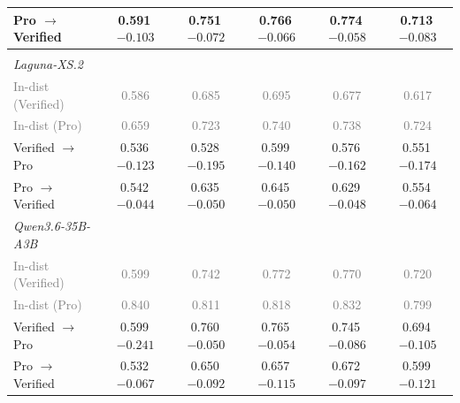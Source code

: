 \begin{table}[t]
\begin{tabular}{lccccc}
\qquad{}Pro $\rightarrow$ Verified & 0.591\,{\scriptsize \textcolor{red!70!black}{$-0.103$}} & 0.751\,{\scriptsize \textcolor{red!70!black}{$-0.072$}} & 0.766\,{\scriptsize \textcolor{red!70!black}{$-0.066$}} & 0.774\,{\scriptsize \textcolor{red!70!black}{$-0.058$}} & 0.713\,{\scriptsize \textcolor{red!70!black}{$-0.083$}}  \\
\midrule
\multicolumn{6}{l}{\textit{\Regressions{}}} \\
\quad{}\textit{Laguna-XS.2} \\
\qquad{}\textcolor{gray}{\small In-dist (Verified)} & \textcolor{gray}{\small 0.586} & \textcolor{gray}{\small 0.685} & \textcolor{gray}{\small 0.695} & \textcolor{gray}{\small 0.677} & \textcolor{gray}{\small 0.617} \\
\qquad{}\textcolor{gray}{\small In-dist (Pro)} & \textcolor{gray}{\small 0.659} & \textcolor{gray}{\small 0.723} & \textcolor{gray}{\small 0.740} & \textcolor{gray}{\small 0.738} & \textcolor{gray}{\small 0.724} \\
\qquad{}Verified $\rightarrow$ Pro & 0.536\,{\scriptsize \textcolor{red!70!black}{$-0.123$}} & 0.528\,{\scriptsize \textcolor{red!70!black}{$-0.195$}} & 0.599\,{\scriptsize \textcolor{red!70!black}{$-0.140$}} & 0.576\,{\scriptsize \textcolor{red!70!black}{$-0.162$}} & 0.551\,{\scriptsize \textcolor{red!70!black}{$-0.174$}}  \\
\qquad{}Pro $\rightarrow$ Verified & 0.542\,{\scriptsize \textcolor{red!70!black}{$-0.044$}} & 0.635\,{\scriptsize \textcolor{red!70!black}{$-0.050$}} & 0.645\,{\scriptsize \textcolor{red!70!black}{$-0.050$}} & 0.629\,{\scriptsize \textcolor{red!70!black}{$-0.048$}} & 0.554\,{\scriptsize \textcolor{red!70!black}{$-0.064$}}  \\
\quad{}\textit{Qwen3.6-35B-A3B} \\
\qquad{}\textcolor{gray}{\small In-dist (Verified)} & \textcolor{gray}{\small 0.599} & \textcolor{gray}{\small 0.742} & \textcolor{gray}{\small 0.772} & \textcolor{gray}{\small 0.770} & \textcolor{gray}{\small 0.720} \\
\qquad{}\textcolor{gray}{\small In-dist (Pro)} & \textcolor{gray}{\small 0.840} & \textcolor{gray}{\small 0.811} & \textcolor{gray}{\small 0.818} & \textcolor{gray}{\small 0.832} & \textcolor{gray}{\small 0.799} \\
\qquad{}Verified $\rightarrow$ Pro & 0.599\,{\scriptsize \textcolor{red!70!black}{$-0.241$}} & 0.760\,{\scriptsize \textcolor{red!70!black}{$-0.050$}} & 0.765\,{\scriptsize \textcolor{red!70!black}{$-0.054$}} & 0.745\,{\scriptsize \textcolor{red!70!black}{$-0.086$}} & 0.694\,{\scriptsize \textcolor{red!70!black}{$-0.105$}}  \\
\qquad{}Pro $\rightarrow$ Verified & 0.532\,{\scriptsize \textcolor{red!70!black}{$-0.067$}} & 0.650\,{\scriptsize \textcolor{red!70!black}{$-0.092$}} & 0.657\,{\scriptsize \textcolor{red!70!black}{$-0.115$}} & 0.672\,{\scriptsize \textcolor{red!70!black}{$-0.097$}} & 0.599\,{\scriptsize \textcolor{red!70!black}{$-0.121$}}  \\
\bottomrule
\end{tabular}
\end{table}